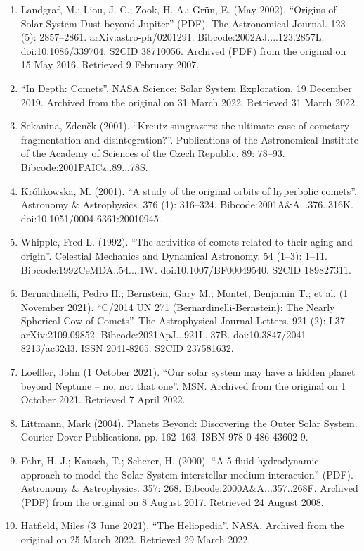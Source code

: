 \begin{enumerate}
\item Landgraf, M.; Liou, J.-C.; Zook, H. A.; Grün, E. (May 2002). ``Origins of Solar System Dust beyond Jupiter'' (PDF). The Astronomical Journal. 123 (5): 2857–2861. arXiv:astro-ph/0201291. Bibcode:2002AJ....123.2857L. doi:10.1086/339704. S2CID 38710056. Archived (PDF) from the original on 15 May 2016. Retrieved 9 February 2007.
\item ``In Depth: Comets''. NASA Science: Solar System Exploration. 19 December 2019. Archived from the original on 31 March 2022. Retrieved 31 March 2022.
\item Sekanina, Zdeněk (2001). ``Kreutz sungrazers: the ultimate case of cometary fragmentation and disintegration?''. Publications of the Astronomical Institute of the Academy of Sciences of the Czech Republic. 89: 78–93. Bibcode:2001PAICz..89...78S.
\item Królikowska, M. (2001). ``A study of the original orbits of hyperbolic comets''. Astronomy \& Astrophysics. 376 (1): 316–324. Bibcode:2001A\&A...376..316K. doi:10.1051/0004-6361:20010945.
\item Whipple, Fred L. (1992). ``The activities of comets related to their aging and origin''. Celestial Mechanics and Dynamical Astronomy. 54 (1–3): 1–11. Bibcode:1992CeMDA..54....1W. doi:10.1007/BF00049540. S2CID 189827311.
\item Bernardinelli, Pedro H.; Bernstein, Gary M.; Montet, Benjamin T.; et al. (1 November 2021). ``C/2014 UN 271 (Bernardinelli-Bernstein): The Nearly Spherical Cow of Comets''. The Astrophysical Journal Letters. 921 (2): L37. arXiv:2109.09852. Bibcode:2021ApJ...921L..37B. doi:10.3847/2041-8213/ac32d3. ISSN 2041-8205. S2CID 237581632.
\item Loeffler, John (1 October 2021). ``Our solar system may have a hidden planet beyond Neptune – no, not that one''. MSN. Archived from the original on 1 October 2021. Retrieved 7 April 2022.
\item Littmann, Mark (2004). Planets Beyond: Discovering the Outer Solar System. Courier Dover Publications. pp. 162–163. ISBN 978-0-486-43602-9.
\item Fahr, H. J.; Kausch, T.; Scherer, H. (2000). ``A 5-fluid hydrodynamic approach to model the Solar System-interstellar medium interaction'' (PDF). Astronomy \& Astrophysics. 357: 268. Bibcode:2000A\&A...357..268F. Archived (PDF) from the original on 8 August 2017. Retrieved 24 August 2008.
\item Hatfield, Miles (3 June 2021). ``The Heliopedia''. NASA. Archived from the original on 25 March 2022. Retrieved 29 March 2022.

\end{enumerate}
